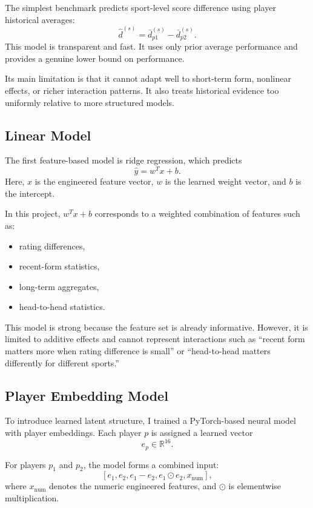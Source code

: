 \documentclass[10pt,twocolumn]{article}
\begin{document}
The simplest benchmark predicts sport-level score difference using player historical averages:
\[
    \hat d^{(s)} = \bar d_{p1}^{(s)} - \bar d_{p2}^{(s)}.
\]
This model is transparent and fast. It uses only prior average performance and provides a genuine lower bound on performance.

Its main limitation is that it cannot adapt well to short-term form, nonlinear effects, or richer interaction patterns. It also treats historical evidence too uniformly relative to more structured models.

\subsection{Linear Model}

The first feature-based model is ridge regression, which predicts
\[
    \hat y = w^T x + b.
\]
Here, $x$ is the engineered feature vector, $w$ is the learned weight vector, and $b$ is the intercept.

In this project, $w^T x + b$ corresponds to a weighted combination of features such as:
\begin{itemize}[leftmargin=1.2em,itemsep=0.25em]
    \item rating differences,
    \item recent-form statistics,
    \item long-term aggregates,
    \item head-to-head statistics.
\end{itemize}

This model is strong because the feature set is already informative. However, it is limited to additive effects and cannot represent interactions such as ``recent form matters more when rating difference is small'' or ``head-to-head matters differently for different sports.''

\subsection{Player Embedding Model}

To introduce learned latent structure, I trained a PyTorch-based neural model with player embeddings. Each player $p$ is assigned a learned vector
\[
    e_p \in \mathbb{R}^{16}.
\]

For players $p_1$ and $p_2$, the model forms a combined input:
\[
    [e_1, e_2, e_1 - e_2, e_1 \odot e_2, x_{\text{num}}],
\]
where $x_{\text{num}}$ denotes the numeric engineered features, and $\odot$ is elementwise multiplication.
\end{document}
